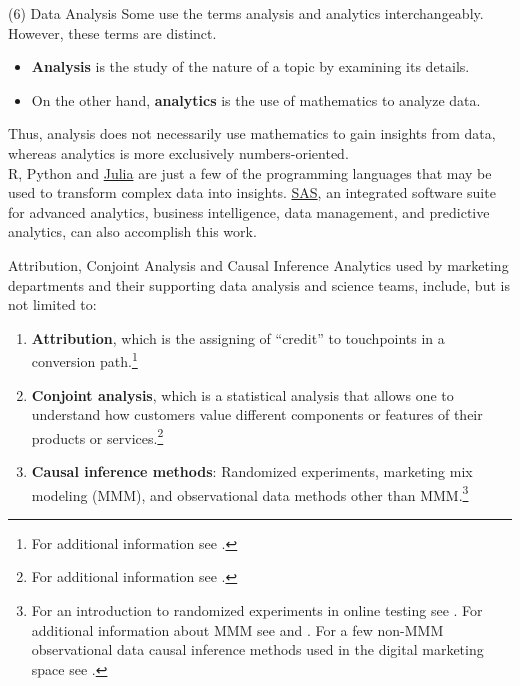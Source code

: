 \documentclass[pdf]{beamer}
\newcommand{\empr}[1]{{\color{franklinblue}\textbf{#1}}}
\theoremstyle{remark}
\theoremstyle{definition}
\begin{document}
\begin{frame}[t]{(6) Data Analysis}
Some use the terms analysis and analytics interchangeably. However, these terms are distinct. \\
\vspace{1.5ex}
\small
\begin{itemize}
\item \empr{Analysis} is the study of the nature of a topic by examining its details. 
\item On the other hand, \empr{analytics} is the use of mathematics to analyze data. 
\end{itemize}
\normalsize
Thus, analysis does not necessarily use mathematics to gain insights from data, whereas analytics is more exclusively numbers-oriented. \\
\vspace{1.5ex}
R, Python and \href{https://julialang.org/}{Julia} are just a few of the programming languages that may be used to transform complex data into insights.  \href{https://www.sas.com/en_us/home.html}{SAS}, an integrated software suite for advanced analytics, business intelligence, data management, and predictive analytics,  can also accomplish this work.  
\end{frame}

\begin{frame}[t]{Attribution, Conjoint Analysis and Causal Inference}
Analytics used by marketing departments and their supporting data analysis and science teams, include, but is not limited to:
\small
\begin{enumerate}
  \item \empr{Attribution}, which is the assigning of  ``credit'' to touchpoints in a conversion path.\footnote{For additional information see \cite{danaher2018}.} 
  \item \empr{Conjoint analysis},  which is a statistical analysis that allows one to understand how customers value different components or features of their products or services.\footnote{For additional information see \cite{agarwal2015}.}
  \item \empr{Causal inference methods}: Randomized experiments, marketing mix modeling (MMM), and observational data methods other than MMM.\footnote{For an introduction to randomized experiments in online testing see \cite{kohavi2017}.  For additional information about MMM see \cite{tellis2006}  and  \cite{papies2017}. For a few non-MMM observational data causal inference methods used in the digital marketing space see \cite{gordon2019}.}
\end{enumerate}
\end{frame}
\end{document}
